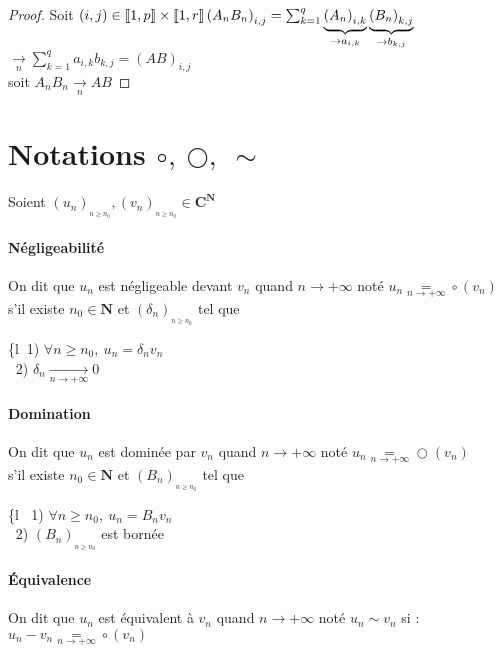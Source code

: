 		\begin{proof}
			Soit $(i,j)\in{\llbracket 1,p \rrbracket}\times{\llbracket 1,r \rrbracket}  \left(A_nB_n\right) _{i,j} = \sum_{k=1}^{q} \underbrace{\left(A_n\right)_{i,k}}_{\rightarrow a_{i,k}}
			\underbrace{\left(B_n\right)_{k,j}}_{\rightarrow b_{k,j}}$ $\underset{n}{\rightarrow} \sum_{k=1}^{q} a_{i,k}b_{k,j} = (AB)_{i,j}$ \\soit 
			$A_nB_n \underset{n}{\rightarrow} AB$
		\end{proof}


\section{Notations $\circ ,~\bigcirc ,~\sim$}
	
		Soient $\left(u_n\right)_{_{n\geq n_0}} ,\left(v_n\right)_{_{n\geq n_0}} \in \mathbf{C}^{\mathbf{N}}$ 
		
		\traitd
		\paragraph{Négligeabilité}
			On dit que $u_n$ est négligeable devant $v_n$ quand $n\rightarrow +\infty$ noté $u_n \underset{n\rightarrow +\infty}{=} \circ (v_n)$ \\
			s'il existe $n_0 \in \mathbf{N}$ et $\left(\delta_n\right)_{_{n\geq n_0}}$ tel que
			\hspace*{0.3cm} \begin{blockarray}[t]{\{l}$~$ {\small 1)} $\forall n\geq n_0 ,~u_n = \delta_nv_n$ \\ 
			$~$ {\small 2)} $\delta_n \underset{n\rightarrow +\infty}{\longrightarrow} 0$ \end{blockarray} 
		\traitdouble
		\paragraph{Domination}
			On dit que $u_n$ est dominée par $v_n$ quand $n\rightarrow +\infty$ noté $u_n \underset{n\rightarrow +\infty}{=} \bigcirc (v_n)$ \\
			s'il existe $n_0 \in \mathbf{N}$ et $\left(B_n\right)_{_{n\geq n_0}}$ tel que
			\hspace*{0.3cm} \begin{blockarray}[t]{\{l} $~$ {\small 1)} $\forall n\geq n_0 ,~u_n = B_nv_n$ \\ 
			$~$ {\small 2)} $\left( B_n \right)_{_{n\geq n_0}}$ est bornée \end{blockarray} 
		\traitdouble
		\paragraph{Équivalence}
			On dit que $u_n$ est équivalent à $v_n$ quand $n\rightarrow +\infty$ noté $u_n \sim v_n$ 
			si : \\ \hspace*{6cm} $ u_n - v_n \underset{n\rightarrow +\infty}{=} \circ (v_n) $
		\trait


